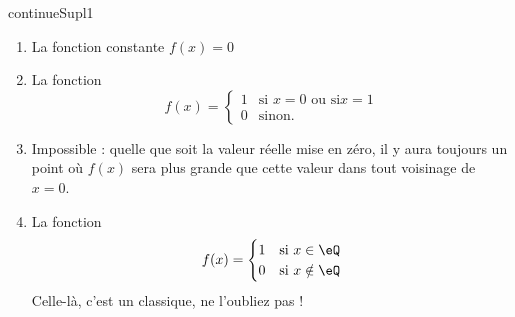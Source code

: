 
\begin{corrige}{continueSupl1}

\begin{enumerate}
\item La fonction constante $f(x)=0$
\item La fonction
\begin{equation}
	f(x)=\begin{cases}
        1	&	\text{si }x=0  \text{ ou  si} x=1 \\
	0	&	 \text{sinon.}
\end{cases}
\end{equation}

\item Impossible :  quelle que soit la valeur réelle mise en zéro, il y aura toujours un point où $f(x)$ sera plus grande que cette valeur dans tout voisinage de $x=0$.
\item La fonction
\begin{equation}		\label{EqSupl1Dirich}
	f(x)=\begin{cases}
	1	&	\text{si }x\in\eQ\\
	0	&	 \text{si }x\notin\eQ
\end{cases}
\end{equation}
Celle-là, c'est un classique, ne l'oubliez pas !

\end{enumerate}

\end{corrige}
